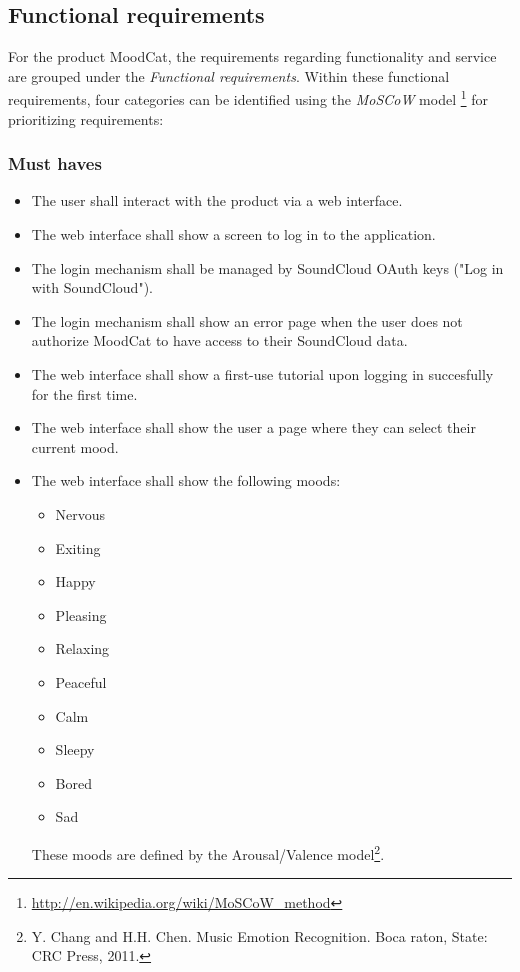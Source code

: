 
\subsection{Functional requirements}
For the product MoodCat, the requirements regarding functionality and service are grouped under the \emph{Functional requirements}.
Within these functional requirements, four categories can be identified using the \emph{MoSCoW} model \footnote{\url{http://en.wikipedia.org/wiki/MoSCoW_method}} for prioritizing requirements:

\subsubsection{Must haves}
\begin{itemize}
\item The user shall interact with the product via a web interface.

\item The web interface shall show a screen to log in to the application.

\item The login mechanism shall be managed by SoundCloud OAuth keys ("Log in with SoundCloud").

\item The login mechanism shall show an error page when the user does not authorize MoodCat to have access to their SoundCloud data.

\item The web interface shall show a first-use tutorial upon logging in succesfully for the first time.

\item The web interface shall show the user a page where they can select their current mood.

\item The web interface shall show the following moods:
		\begin{itemize}
		\item Nervous
		\item Exiting
		\item Happy
		\item Pleasing
		\item Relaxing
		\item Peaceful
		\item Calm
		\item Sleepy
		\item Bored
		\item Sad
		\end{itemize}
	  These moods are defined by the Arousal/Valence model\footnote{Y. Chang and H.H. Chen. Music Emotion Recognition. Boca raton, State:
CRC Press, 2011.}.


\end{itemize}
